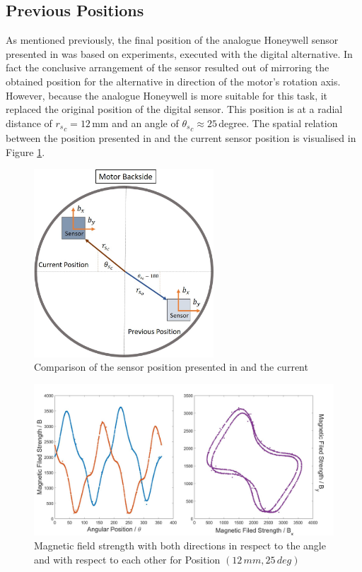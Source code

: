 \documentclass[english]{isasthesis}
\begin{document}
    		\subsection{Previous Positions}
    		As mentioned previously, the final position of the analogue Honeywell sensor presented in \citep{fabian} was based on experiments, executed with the digital alternative. In fact the conclusive arrangement of the sensor resulted out of mirroring the obtained position for the alternative in direction of the motor's rotation axis. However, because the analogue Honeywell is more suitable for this task, it replaced the original position of the digital sensor. This position is at a radial distance of ${r_s}_c = 12\,$mm and an angle of ${\theta_s}_c \approx 25\,$degree. The spatial relation between the position presented in \citep{fabian} and the current sensor position is visualised in Figure \ref{fig:old vs current position}.
    		\begin{figure}[p!]
    		\begin{center}
    			\includegraphics[width=0.6\textwidth]{figures/Old_vs_Current_position.jpg}   		
  			\end{center}
    		\caption{Comparison of the sensor position presented in \citep{fabian} and the current}
    		\label{fig:old vs current position}
    		\end{figure}
    		\begin{figure}[p!]
    		\centering
    		\includegraphics[width=1\textwidth]{figures/tiled_magX_vs_MagY.jpg}   		
    		\caption{Magnetic field strength with both directions in respect to the angle and with respect to each other for Position $(12\,mm, 25\,deg)$}
    		\label{fig:current pos signal shape}
    		\end{figure} 		
\end{document}
